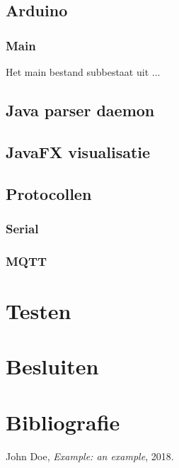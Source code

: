 \documentclass[a4paper]{report}
\begin{document}
\section{Arduino}
\subsection{Main}
Het main bestand subbestaat uit ...

\section{Java parser daemon}

\section{JavaFX visualisatie}

\section{Protocollen}
\subsection{Serial}

\subsection{MQTT}

\chapter{Testen}

\chapter{Besluiten}

\chapter{Bibliografie}

\begin{thebibliography}{9}

  John Doe,
  \textit{Example: an example},
  2018.

\end{thebibliography}
\end{document}
